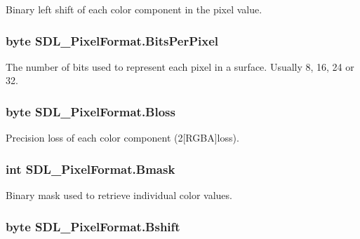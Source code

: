 Binary left shift of each color component in the pixel value. 

\hypertarget{struct_s_d_l___pixel_format_a28aabdce8eba3259ddea6b43a8703387}{
\subsubsection[{BitsPerPixel}]{\setlength{\rightskip}{0pt plus 5cm}byte {\bf SDL\_\-PixelFormat.BitsPerPixel}}}
\label{struct_s_d_l___pixel_format_a28aabdce8eba3259ddea6b43a8703387}


The number of bits used to represent each pixel in a surface. Usually 8, 16, 24 or 32. 

\hypertarget{struct_s_d_l___pixel_format_a8fc149bdf59ec68f4d7c1e11a1bf36d7}{
\subsubsection[{Bloss}]{\setlength{\rightskip}{0pt plus 5cm}byte {\bf SDL\_\-PixelFormat.Bloss}}}
\label{struct_s_d_l___pixel_format_a8fc149bdf59ec68f4d7c1e11a1bf36d7}


Precision loss of each color component (2\mbox{[}RGBA\mbox{]}loss). 

\hypertarget{struct_s_d_l___pixel_format_a491f4f2d29b60b352ab7a4ce3b8e14de}{
\subsubsection[{Bmask}]{\setlength{\rightskip}{0pt plus 5cm}int {\bf SDL\_\-PixelFormat.Bmask}}}
\label{struct_s_d_l___pixel_format_a491f4f2d29b60b352ab7a4ce3b8e14de}


Binary mask used to retrieve individual color values. 

\hypertarget{struct_s_d_l___pixel_format_a1997c5cc46cd8e25fc2d231bfc704bed}{
\subsubsection[{Bshift}]{\setlength{\rightskip}{0pt plus 5cm}byte {\bf SDL\_\-PixelFormat.Bshift}}}
\label{struct_s_d_l___pixel_format_a1997c5cc46cd8e25fc2d231bfc704bed}


